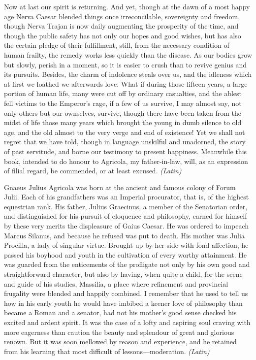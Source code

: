 Now at last our spirit is returning. And yet, though at the dawn of a most happy age Nerva Caesar blended things once irreconcilable, sovereignty and freedom, though Nerva Trajan is now daily augmenting the prosperity of the time, and though the public safety has not only our hopes and good wishes, but has also the certain pledge of their fulfillment, still, from the necessary condition of human frailty, the remedy works less quickly than the disease. As our bodies grow but slowly, perish in a moment, so it is easier to crush than to revive genius and its pursuits. Besides, the charm of indolence steals over us, and the idleness which at first we loathed we afterwards love. What if during those fifteen years, a large portion of human life, many were cut off by ordinary casualties, and the ablest fell victims to the Emperor's rage, if a few of us survive, I may almost say, not only others but our ownselves, survive, though there have been taken from the midst of life those many years which brought the young in dumb silence to old age, and the old almost to the very verge and end of existence! Yet we shall not regret that we have told, though in language unskilful and unadorned, the story of past servitude, and borne our testimony to present happiness. Meanwhile this book, intended to do honour to Agricola, my father-in-law, will, as an expression of filial regard, be commended, or at least excused. \emph{(Latin)}


Gnaeus Julius Agricola was born at the ancient and famous colony of Forum Julii. Each of his grandfathers was an Imperial procurator, that is, of the highest equestrian rank. His father, Julius Graecinus, a member of the Senatorian order, and distinguished for his pursuit of eloquence and philosophy, earned for himself by these very merits the displeasure of Gaius Caesar. He was ordered to impeach Marcus Silanus, and because he refused was put to death. His mother was Julia Procilla, a lady of singular virtue. Brought up by her side with fond affection, he passed his boyhood and youth in the cultivation of every worthy attainment. He was guarded from the enticements of the profligate not only by his own good and straightforward character, but also by having, when quite a child, for the scene and guide of his studies, Massilia, a place where refinement and provincial frugality were blended and happily combined. I remember that he used to tell us how in his early youth he would have imbibed a keener love of philosophy than became a Roman and a senator, had not his mother's good sense checked his excited and ardent spirit. It was the case of a lofty and aspiring soul craving with more eagerness than caution the beauty and splendour of great and glorious renown. But it was soon mellowed by reason and experience, and he retained from his learning that most difficult of lessons—moderation. \emph{(Latin)}


